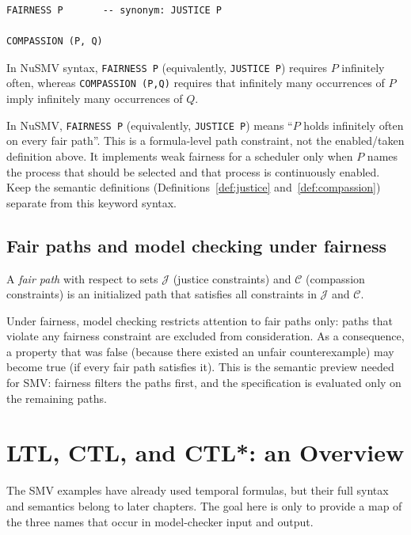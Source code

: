 \begin{verbatim}
FAIRNESS P       -- synonym: JUSTICE P

COMPASSION (P, Q)
\end{verbatim}
In NuSMV syntax, \texttt{FAIRNESS P} (equivalently, \texttt{JUSTICE P})
requires $P$ infinitely often, whereas \texttt{COMPASSION (P,Q)} requires
that infinitely many occurrences of $P$ imply infinitely many occurrences
of $Q$.

\begin{remark}
In NuSMV, \texttt{FAIRNESS P} (equivalently, \texttt{JUSTICE P}) means ``$P$ holds
infinitely often on every fair path''.  This is a formula-level path
constraint, not the enabled/taken definition above.  It implements weak
fairness for a scheduler only when $P$ names the process that should be
selected and that process is continuously enabled.  Keep the semantic
definitions (Definitions~\ref{def:justice} and~\ref{def:compassion}) separate
from this keyword syntax.
\end{remark}

\subsection{Fair paths and model checking under fairness}

A \emph{fair path} with respect to sets $\mathcal{J}$ (justice constraints)
and $\mathcal{C}$ (compassion constraints) is an initialized path that
satisfies all constraints in $\mathcal{J}$ and $\mathcal{C}$.

Under fairness, model checking restricts attention to fair paths only:
paths that violate any fairness constraint are excluded from consideration.
As a consequence, a property that was false (because there existed an
unfair counterexample) may become true (if every fair path satisfies it).
This is the semantic preview needed for SMV: fairness filters the paths
first, and the specification is evaluated only on the remaining paths.

\section{LTL, CTL, and CTL*: an Overview}
\label{sec:ltl-ctl-overview}

The SMV examples have already used temporal formulas, but their full syntax
and semantics belong to later chapters.  The goal here is only to provide a
map of the three names that occur in model-checker input and output.

